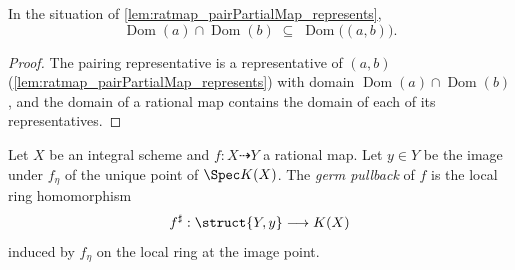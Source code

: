 \begin{lemma}
  \label{lem:ratmap_le_domain_prod}
  \leanok
  In the situation of \ref{lem:ratmap_pairPartialMap_represents},
  \[
    \operatorname{Dom}(a) \cap \operatorname{Dom}(b)
    \;\subseteq\; \operatorname{Dom}\bigl((a,b)\bigr).
  \]
\end{lemma}
\begin{proof}
  \leanok
  The pairing representative is a representative of \((a, b)\)
  (\ref{lem:ratmap_pairPartialMap_represents}) with domain
  \(\operatorname{Dom}(a) \cap \operatorname{Dom}(b)\), and the domain of a
  rational map contains the domain of each of its representatives.
\end{proof}

\begin{definition}
  \label{def:ratmap_stalkPullback}
  \leanok
  Let \(X\) be an integral scheme and \(f : X \dashrightarrow Y\) a rational
  map. Let \(y \in Y\) be the image under \(f_\eta\) of the unique point of
  \(\Spec K(X)\). The \emph{germ pullback} of \(f\) is the local ring
  homomorphism
  \[
    f^\sharp : \struct{Y, y} \longrightarrow K(X)
  \]
  induced by \(f_\eta\) on the local ring at the image point.
\end{definition}

